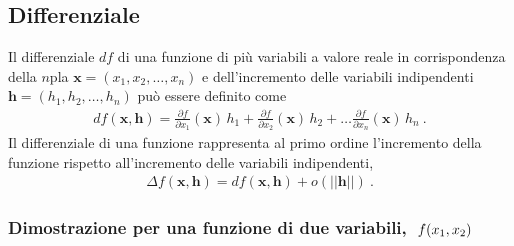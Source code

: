 \documentclass[letterpaper,10pt,english]{jupyterBook}
\begin{document}
\subsection{Differenziale}
\label{\detokenize{ch/multivariable-calculus/derivatives:differenziale}}
\sphinxAtStartPar
Il differenziale \(d f\) di una funzione di più variabili a valore reale in corrispondenza della \(n\)\sphinxhyphen{}pla \(\mathbf{x} = (x_1, x_2, \dots, x_n)\) e dell’incremento delle variabili indipendenti \(\mathbf{h} = (h_1, h_2, \dots, h_n)\) può essere definito come
\begin{equation*}
\begin{split}d f (\mathbf{x}, \mathbf{h}) = \frac{\partial f}{\partial x_1}(\mathbf{x}) \,  h_1 +   
                                 \frac{\partial f}{\partial x_2}(\mathbf{x}) \,  h_2 + \dots
                                 \frac{\partial f}{\partial x_n}(\mathbf{x}) \,  h_n \ .  \end{split}
\end{equation*}
\sphinxAtStartPar
Il differenziale di una funzione rappresenta al primo ordine l’incremento della funzione rispetto all’incremento delle variabili indipendenti,
\begin{equation*}
\begin{split} \Delta f(\mathbf{x}, \mathbf{h}) = df(\mathbf{x}, \mathbf{h}) + o(||\mathbf{h}||)\ .\end{split}
\end{equation*}\subsubsection*{Dimostrazione per una funzione di due variabili, \protect\(\ f(x_1, x_2) \protect\)}
\end{document}
